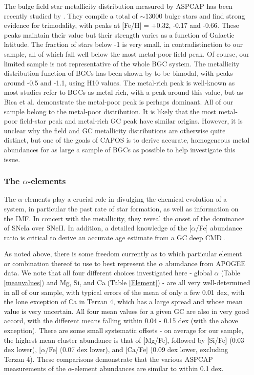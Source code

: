 \documentclass[onecolumn]{aa}
\begin{document}
The bulge field star metallicity distribution measured by ASPCAP has been recently studied by \citet{Rojas-Arriagada2020}. They compile a total of $\sim$13000 bulge stars and find strong evidence for trimodality, with peaks at [Fe/H] = +0.32, -0.17 and -0.66. These peaks maintain their value but their strength varies as a function of Galactic latitude. The fraction of stars below -1 is very small,
in contradistinction to our sample, all of which fall well below the most metal-poor field peak. Of course, our limited sample is not representative of the whole BGC system. The metallicity distribution function of BGCs has been shown by \citet{Bica2016} to be bimodal, with peaks around -0.5 and -1.1, using H10 values. The metal-rich peak is well-known as most studies refer to BGCs as metal-rich, with a peak around this value, but as Bica et al. demonstrate the metal-poor peak is perhaps dominant. All of our sample belong to the metal-poor distribution. It is likely that the most metal-poor field-star peak and metal-rich GC peak have similar origins. However,
it is unclear why the field and GC metallicity distributions are otherwise quite distinct, but one of the goals of CAPOS is to derive accurate, homogeneous metal abundances for as large a sample of BGCs as possible to help investigate this issue.

\subsubsection{The $\alpha$-elements}
The $\alpha$-elements play a crucial role in divulging the chemical evolution of a system, in particular the past rate of star formation, as well as information on the IMF. In  concert with the metallicity, they reveal the onset of the dominance of SNeIa over SNeII.
In addition, a detailed knowledge of the [$\alpha$/Fe] abundance ratio is critical to derive an accurate age estimate from a GC deep CMD \citep[e.g.,][and references therein]{Catelan2018}. 

As noted above, there is some freedom currently as to which particular element or combination thereof to use to best represent the $\alpha$ abundance from APOGEE data. We note that all four different choices investigated here - global $\alpha$ (Table \ref{meanvalues})
and Mg, Si, and Ca (Table \ref{Element}) - are all very well-determined in all of our sample, with typical errors of the mean of only a few 0.01 dex, with the lone exception of Ca in Terzan 4, which has a large spread and whose mean value is very uncertain. All four mean values for a given GC are also in very good accord, with the different means falling within 0.04 - 0.15 dex (with the above exception). There are some small systematic offsets - on average for our sample, the highest mean cluster abundance is that of [Mg/Fe], followed by [Si/Fe] (0.03 dex lower), [$\alpha$/Fe] (0.07 dex lower),  and [Ca/Fe] (0.09 dex lower, excluding Terzan 4).
These comparisons demonstrate that the various ASPCAP measurements of the $\alpha$-element abundances are similar to within 0.1 dex.
\end{document}
